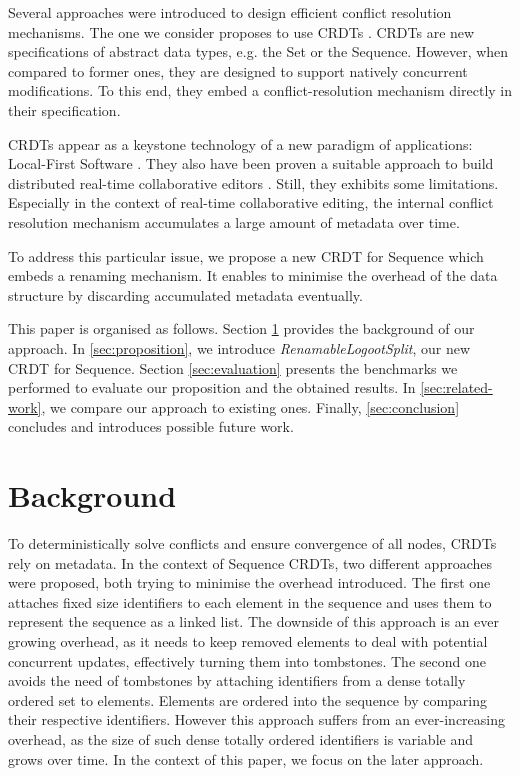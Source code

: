 \documentclass[sigplan,10pt,authorversion]{acmart}
\begin{document}
Several approaches were introduced to design efficient conflict resolution mechanisms.
The one we consider proposes to use \acfp{CRDT} \cite{shapiro_2011_crdt}.
\acp{CRDT} are new specifications of abstract data types, e.g. the Set or the Sequence.
However, when compared to former ones, they are designed to support natively concurrent modifications.
To this end, they embed a conflict-resolution mechanism directly in their specification.

\acp{CRDT} appear as a keystone technology of a new paradigm of applications: Local-First Software \cite{10.1145/3359591.3359737}.
They also have been proven a suitable approach to build distributed real-time collaborative editors \cite{doi:10.1002/cpe.4108}.
Still, they exhibits some limitations.
Especially in the context of real-time collaborative editing, the internal conflict resolution mechanism accumulates a large amount of metadata over time.

To address this particular issue, we propose a new \ac{CRDT} for Sequence which embeds a renaming mechanism.
It enables to minimise the overhead of the data structure by discarding accumulated metadata eventually.

This paper is organised as follows.
Section \ref{sec:background} provides the background of our approach.
In \autoref{sec:proposition}, we introduce \emph{RenamableLogootSplit}, our new \ac{CRDT} for Sequence.
Section \ref{sec:evaluation} presents the benchmarks we performed to evaluate our proposition and the obtained results.
In \autoref{sec:related-work}, we compare our approach to existing ones.
Finally, \autoref{sec:conclusion} concludes and introduces possible future work.

\section{Background}
\label{sec:background}

To deterministically solve conflicts and ensure convergence of all nodes, \acp{CRDT} rely on metadata.
In the context of Sequence \acp{CRDT}, two different approaches were proposed, both trying to minimise the overhead introduced.
The first one \cite{oster:inria-00108523, ROH2011354,briot:hal-01343941} attaches fixed size identifiers to each element in the sequence and uses them to represent the sequence as a linked list.
The downside of this approach is an ever growing overhead, as it needs to keep removed elements to deal with potential concurrent updates, effectively turning them into tombstones.
The second one \cite{5158449,WeissICDCS09,AndreCollaborateCom2013} avoids the need of tombstones by attaching identifiers from a dense totally ordered set to elements.
Elements are ordered into the sequence by comparing their respective identifiers.
However this approach suffers from an ever-increasing overhead, as the size of such dense totally ordered identifiers is variable and grows over time.
In the context of this paper, we focus on the later approach.
\end{document}

